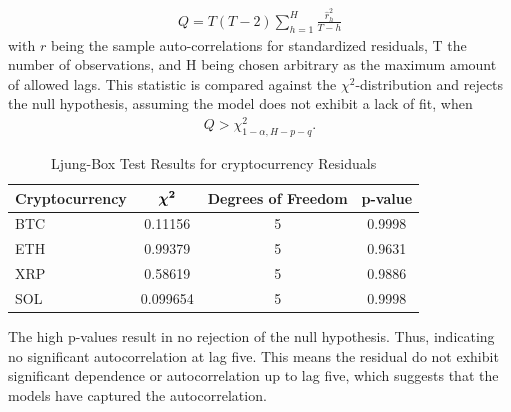 \begin{align*}
    Q=T(T-2)\sum^H_{h=1}\frac{\hat{r}^2_{h}}{T-h}
\end{align*}
with $r$ being the sample auto-correlations for standardized residuals, T the number of observations, and H being chosen arbitrary as the maximum amount of allowed lags. This statistic is compared against the $\chi^2$-distribution and rejects the null hypothesis,  assuming the model does not exhibit a lack of fit, when
\begin{align*}
    Q>\chi^2_{1-\alpha,H-p-q}.
\end{align*}
\begin{table}[H]
\centering
\begin{tabular}{|l|c|c|c|}
\hline
\textbf{Cryptocurrency} & $\boldsymbol{\chi^2}$ & \textbf{Degrees of Freedom} & \textbf{p-value} \\
\hline
BTC & 0.11156 & 5 & 0.9998 \\
ETH & 0.99379 & 5 & 0.9631 \\
XRP & 0.58619 & 5 & 0.9886 \\
SOL & 0.099654 & 5 & 0.9998 \\
\hline
\end{tabular}
\caption{Ljung-Box Test Results for cryptocurrency Residuals}
\label{tab:ljung_box}
\end{table}
\noindent The high p-values result in no rejection of the null hypothesis. Thus, indicating no significant autocorrelation at lag five. This means the residual do not exhibit significant dependence or autocorrelation up to lag five, which suggests that the models have captured the autocorrelation.
